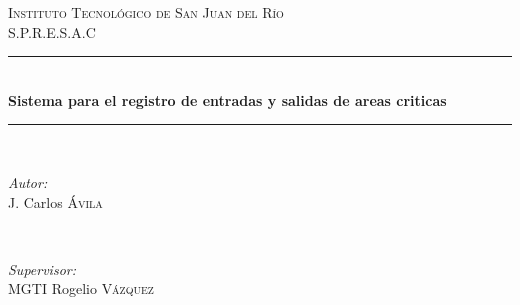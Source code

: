 \documentclass[12pt]{article} %
\begin{document}

\begin{titlepage}

\newcommand{\HRule}{\rule{\linewidth}{0.5mm}} %

\center %
 

\textsc{\LARGE Instituto Tecnológico de San Juan del Río}\\[1.5cm] %
\textsc{\Large S.P.R.E.S.A.C}\\[0.5cm] %


\HRule \\[0.4cm]
{ \huge \bfseries Sistema para el registro de entradas y salidas de areas criticas}\\[0.4cm] %
\HRule \\[1.5cm]
 

\begin{minipage}{0.4\textwidth}
\begin{flushleft} \large
\emph{Autor:}\\
J. Carlos \textsc{\'Avila} %
\end{flushleft}
\end{minipage}
~
\begin{minipage}{0.4\textwidth}
\begin{flushright} \large
\emph{Supervisor:} \\
MGTI Rogelio \textsc{V\'azquez} %
\end{flushright}
\end{minipage}\\[4cm]


\end{titlepage}
\end{document}
